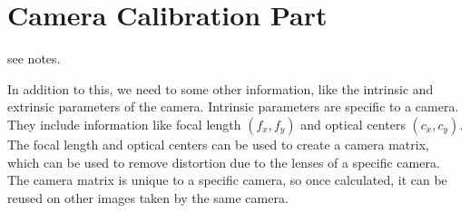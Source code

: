 \documentclass{article}
\begin{document}
\begin{itemize}
\begin{itemize}
    \end{itemize}


    \section{Camera Calibration Part}
    see notes.

    In addition to this, we need to some other information, like the intrinsic and extrinsic parameters of the camera. Intrinsic parameters are specific to a camera. They include information like focal length \((f_x,f_y)\) and optical centers \((c_x,c_y)\). The focal length and optical centers can be used to create a camera matrix, which can be used to remove distortion due to the lenses of a specific camera. The camera matrix is unique to a specific camera, so once calculated, it can be reused on other images taken by the same camera.


\end{itemize}
\end{document}
